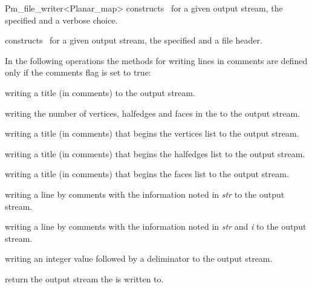 \begin{ccRefClass}{Pm_file_writer<Planar_map>}
{constructs \ccRefName\ for a given output stream, the specified  and a verbose choice.}

{constructs \ccRefName\ for a given output stream, the specified  and a file header.}

\ccOperations

In the following operations the methods for writing lines in comments are defined only if the comments flag is set to true:

{writing a title (in comments) to the output stream.}

{writing the number of vertices, halfedges and faces in the  to the output stream.}

{writing a title (in comments) that begins the vertices list to the output stream.}

{writing a title (in comments) that begins the halfedges list to the output stream.}

{writing a title (in comments) that begins the faces list to the output stream.}

{writing a line by comments with the information noted in {\em str} to the output stream.}

{writing a line by comments with the information noted in {\em str} and {\em i} to the output stream.}

{writing an integer value followed by a deliminator to the output stream.}

{return the output stream the  is written to.} 



\end{ccRefClass}
